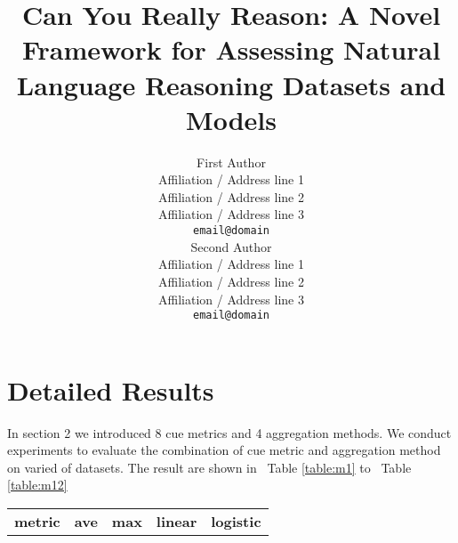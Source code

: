 \documentclass[letterpaper]{article} %
\title{Can You Really Reason: A Novel Framework for Assessing Natural Language Reasoning Datasets and Models}
\author{First Author \\
  Affiliation / Address line 1 \\
  Affiliation / Address line 2 \\
  Affiliation / Address line 3 \\
  \texttt{email@domain} \\\And
  Second Author \\
  Affiliation / Address line 1 \\
  Affiliation / Address line 2 \\
  Affiliation / Address line 3 \\
  \texttt{email@domain} \\}
\date{}
\newcommand{\tabref}[1]{Table \ref{#1}}
\begin{document}

\appendix
\section{Detailed Results}
\label{sec:appendix}
In section 2 we introduced 8 cue metrics and 4 aggregation methods. We conduct experiments to
evaluate the combination of cue metric and aggregation method on varied of datasets. 
The result are shown in ~\tabref{table:m1} to ~\tabref{table:m12}

\begin{table}[htbp]
\begin{tabular}{lllllllll}
\hline
\multicolumn{1}{c}{\multirow{2}{*}{\textbf{metric}}} & \multicolumn{2}{c}{\textbf{ave}}                                                                                                                                   & \multicolumn{2}{c}{\textbf{max}}                                                                                                                                  & \multicolumn{2}{c}{\textbf{linear}}                                                                                                                                & \multicolumn{2}{c}{\textbf{logistic}}                                                                                                                              \\ \cline{2-9} 

\end{tabular}
\end{table}
\end{document}

